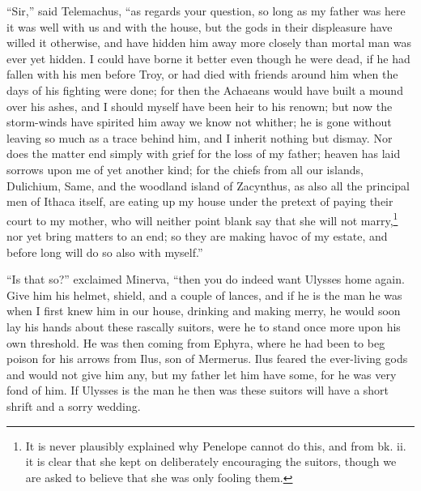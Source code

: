 “Sir,” said Telemachus, “as regards your question, so long as my father was
here it was well with us and with the house, but the gods in their displeasure
have willed it otherwise, and have hidden him away more closely than mortal man
was ever yet hidden. I could have borne it better even though he were dead, if
he had fallen with his men before Troy, or had died with friends around him
when the days of his fighting were done; for then the Achaeans would have built
a mound over his ashes, and I should myself have been heir to his renown; but
now the storm-winds have spirited him away we know not whither; he is gone
without leaving so much as a trace behind him, and I inherit nothing but
dismay. Nor does the matter end simply with grief for the loss of my father;
heaven has laid sorrows upon me of yet another kind; for the chiefs from all
our islands, Dulichium, Same, and the woodland island of Zacynthus, as also all
the principal men of Ithaca itself, are eating up my house under the pretext of
paying their court to my mother, who will neither point blank say that she will
not marry,\footnote{It is never plausibly explained why Penelope cannot do this, and from bk.
ii. it is clear that she kept on deliberately encouraging the suitors, though
we are asked to believe that she was only fooling them.} nor yet
bring matters to an end; so they are making havoc of my estate, and before long
will do so also with myself.”

“Is that so?” exclaimed Minerva, “then you do indeed want Ulysses home again.
Give him his helmet, shield, and a couple of lances, and if he is the man he
was when I first knew him in our house, drinking and making merry, he would
soon lay his hands about these rascally suitors, were he to stand once more
upon his own threshold. He was then coming from Ephyra, where he had been to
beg poison for his arrows from Ilus, son of Mermerus. Ilus feared the
ever-living gods and would not give him any, but my father let him have some,
for he was very fond of him. If Ulysses is the man he then was these suitors
will have a short shrift and a sorry wedding.

